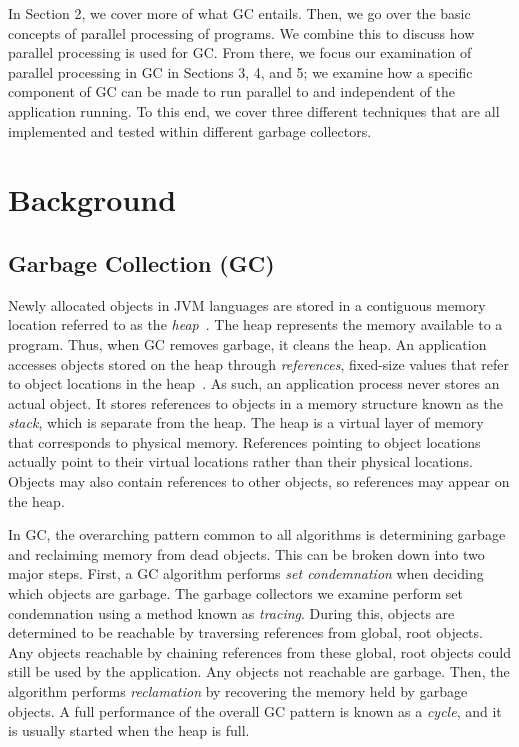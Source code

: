 \documentclass{sig-alternate}
\begin{document}
In Section 2, we cover more of what GC entails. Then, we go over the
basic concepts of parallel processing of programs. We combine this 
to discuss how parallel processing is used for GC.
From there, we focus our examination of parallel processing in GC in Sections 3, 4, and 5;
we examine how a specific component of GC can be made to run parallel to
and independent of the application running. To this end, we cover three
different techniques that are all implemented and tested within different
garbage collectors.


\section{Background}
\label{sec:background}


\subsection{Garbage Collection (GC)}
\label{sec:garbageCollection}

Newly allocated objects in JVM languages are stored in a contiguous memory location referred
to as the \emph{heap}~\cite{oracle:heap}. The heap represents the memory available to a program.
Thus, when GC removes garbage, it cleans the heap.
An application accesses objects stored on the heap through \emph{references},
fixed-size values that refer to object locations in the heap~\cite{reilly:reference}. 
As such, an application process never stores
an actual object. It stores references to objects in a memory structure known
as the \emph{stack}, which is separate from the heap.
The heap is a virtual layer of memory that corresponds to physical memory.
References pointing to object locations actually point to their
virtual locations rather than their physical locations. Objects may also 
contain references to other objects, so references may appear on the heap.

In GC, the overarching pattern common to all algorithms is determining garbage
and reclaiming memory from dead objects. This can be broken down into two major steps.
First, a GC algorithm performs \emph{set condemnation} when deciding which objects are 
garbage. The garbage collectors we examine perform set condemnation using a method 
known as \emph{tracing}. During this, objects are determined to be reachable by 
traversing references from global, root objects. Any objects reachable by chaining references
from these global, root objects could still be used by the application. 
Any objects not reachable are garbage. Then, the algorithm performs 
\emph{reclamation} by recovering the memory held by garbage objects. A full
performance of the overall GC pattern is known as a \emph{cycle}, and it
is usually started when the heap is full.
\end{document}
